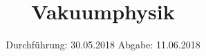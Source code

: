 

\subject{VERSUCH NUMMER 70}
\title{Vakuumphysik}
\date{
  Durchführung: 30.05.2018
  \hspace{3em}
  Abgabe: 11.06.2018
}



\thispagestyle{empty}
\maketitle
\thispagestyle{empty}
\tableofcontents
\newpage
\setcounter{page}{1}


% 




\nocite{*}
\printbibliography


